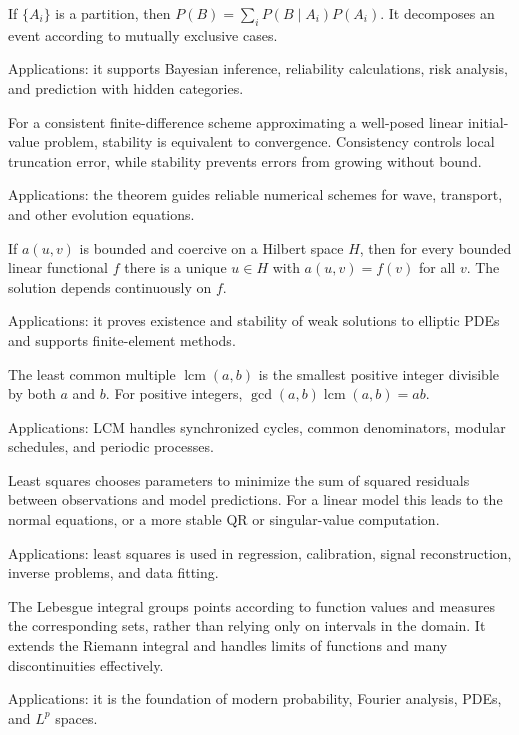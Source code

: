 If $\{A_i\}$ is a partition, then $P(B)=\sum_iP(B\mid A_i)P(A_i)$. It decomposes an event according to mutually exclusive cases. \par\noindent Applications: it supports Bayesian inference, reliability calculations, risk analysis, and prediction with hidden categories.

For a consistent finite-difference scheme approximating a well-posed linear initial-value problem, stability is equivalent to convergence. Consistency controls local truncation error, while stability prevents errors from growing without bound. \par\noindent Applications: the theorem guides reliable numerical schemes for wave, transport, and other evolution equations.

If $a(u,v)$ is bounded and coercive on a Hilbert space $H$, then for every bounded linear functional $f$ there is a unique $u\in H$ with $a(u,v)=f(v)$ for all $v$. The solution depends continuously on $f$. \par\noindent Applications: it proves existence and stability of weak solutions to elliptic PDEs and supports finite-element methods.

The least common multiple $\operatorname{lcm}(a,b)$ is the smallest positive integer divisible by both $a$ and $b$. For positive integers, $\gcd(a,b)\operatorname{lcm}(a,b)=ab$. \par\noindent Applications: LCM handles synchronized cycles, common denominators, modular schedules, and periodic processes.

Least squares chooses parameters to minimize the sum of squared residuals between observations and model predictions. For a linear model this leads to the normal equations, or a more stable QR or singular-value computation. \par\noindent Applications: least squares is used in regression, calibration, signal reconstruction, inverse problems, and data fitting.

The Lebesgue integral groups points according to function values and measures the corresponding sets, rather than relying only on intervals in the domain. It extends the Riemann integral and handles limits of functions and many discontinuities effectively. \par\noindent Applications: it is the foundation of modern probability, Fourier analysis, PDEs, and $L^p$ spaces.

